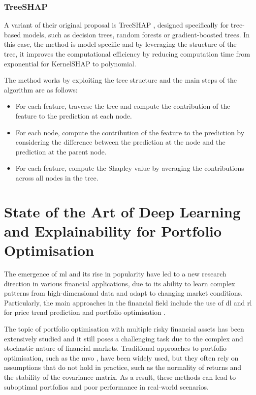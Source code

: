 \subsubsection{TreeSHAP} \label{sec:treeshap}

A variant of their original proposal is TreeSHAP \cite{Lundberg2019}, designed specifically for tree-based models, such as decision trees, random forests or gradient-boosted trees. In this case, the method is model-specific and by leveraging the structure of the tree, it improves the computational efficiency by reducing computation time from exponential for KernelSHAP to polynomial. 

The method works by exploiting the tree structure and the main steps of the algorithm are as follows:
\begin{itemize}
    \item For each feature, traverse the tree and compute the contribution of the feature to the prediction at each node.
    \item For each node, compute the contribution of the feature to the prediction by considering the difference between the prediction at the node and the prediction at the parent node.
    \item For each feature, compute the Shapley value by averaging the contributions across all nodes in the tree.
\end{itemize} 

\section{State of the Art of Deep Learning and Explainability for Portfolio Optimisation} \label{sec:literature review}

The emergence of \acrfull{ml} and its rise in popularity have led to a new research direction in various financial applications, due to its ability to learn complex patterns from high-dimensional data and adapt to changing market conditions. Particularly, the main approaches in the financial field include the use of \acrlong{dl} and \acrfull{rl} for price trend prediction \cite{Zhang2023} and portfolio optimisation \cite{Millea2021}. 

The topic of portfolio optimisation with multiple risky financial assets has been extensively studied and it still poses a challenging task due to the complex and stochastic nature of financial markets. Traditional approaches to portfolio optimisation, such as the \acrfull{mvo} \cite{Markowitz1952}, have been widely used, but they often rely on assumptions that do not hold in practice, such as the normality of returns and the stability of the covariance matrix. As a result, these methods can lead to suboptimal portfolios and poor performance in real-world scenarios.

